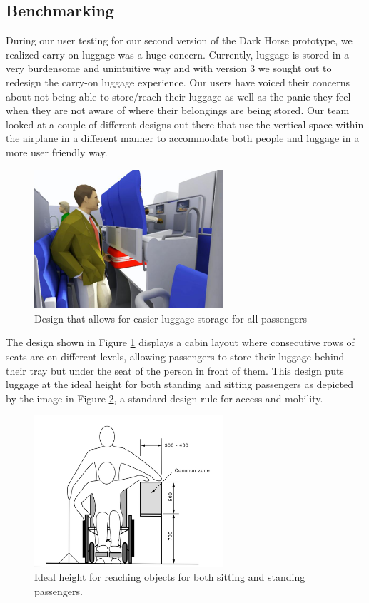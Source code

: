 \subsection{Benchmarking}
During our user testing for our second version of the Dark Horse prototype, we realized carry-on luggage was a huge concern. Currently, luggage is stored in a very burdensome and unintuitive way and with version 3 we sought out to redesign the carry-on luggage experience. 
Our users have voiced their concerns about not being able to store/reach their luggage as well as the panic they feel when they are not aware of where their belongings are being stored. Our team looked at a couple of different designs out there that use the vertical space within the airplane in a different manner to accommodate both people and luggage in a more user friendly way. 

\begin{figure}[h]
  \centering
     \includegraphics[width=7cm]{images/luggage_trays.png}
   \caption{Design that allows for easier luggage storage for all passengers \cite{blue_vertical}}
  \label{fig:luggage_trays.png}
\end{figure}  

The design shown in Figure \ref{fig:luggage_trays.png} displays a cabin layout where consecutive rows of seats are on different levels, allowing passengers to store their luggage behind their tray but under the seat of the person in front of them. This design puts luggage at the ideal height for both standing and sitting passengers as depicted by the image in Figure \ref{fig:correct_height.png}, a standard design rule for access and mobility.  

\begin{figure}[h]
  \centering
     \includegraphics[width=7cm]{images/correct_height.png}
   \caption{Ideal height for reaching objects for both sitting and standing passengers. \cite{correct_height}}
  \label{fig:correct_height.png}
\end{figure} 

